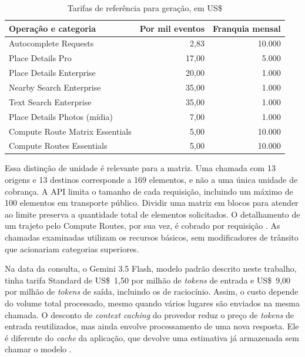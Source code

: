 \begin{table}[H]
\centering
\small
\caption{Tarifas de referência para geração, em US\$}
\label{tab:tarifas-geracao}
\begin{tabularx}{\textwidth}{>{\raggedright\arraybackslash}Xrr}
\hline
\textbf{Operação e categoria} & \textbf{Por mil eventos} & \textbf{Franquia mensal} \\
\hline
Autocomplete Requests & 2,83 & 10.000 \\
Place Details Pro & 17,00 & 5.000 \\
Place Details Enterprise & 20,00 & 1.000 \\
Nearby Search Enterprise & 35,00 & 1.000 \\
Text Search Enterprise & 35,00 & 1.000 \\
Place Details Photos (mídia) & 7,00 & 1.000 \\
Compute Route Matrix Essentials & 5,00 & 10.000 \\
Compute Routes Essentials & 5,00 & 10.000 \\
\hline
\end{tabularx}
\end{table}

Essa distinção de unidade é relevante para a matriz. Uma chamada com 13 origens e 13 destinos corresponde a 169 elementos, e não a uma única unidade de cobrança. A API limita o tamanho de cada requisição, incluindo um máximo de 100 elementos em transporte público. Dividir uma matriz em blocos para atender ao limite preserva a quantidade total de elementos solicitados. O detalhamento de um trajeto pelo Compute Routes, por sua vez, é cobrado por requisição \cite{google_routes_cobranca2026}. As chamadas examinadas utilizam os recursos básicos, sem modificadores de trânsito que acionariam categorias superiores.

Na data da consulta, o Gemini 3.5 Flash, modelo padrão descrito neste trabalho, tinha tarifa Standard de US\$~1,50 por milhão de \textit{tokens} de entrada e US\$~9,00 por milhão de \textit{tokens} de saída, incluindo os de raciocínio. Assim, o custo depende do volume total processado, mesmo quando vários lugares são enviados na mesma chamada. O desconto de \textit{context caching} do provedor reduz o preço de \textit{tokens} de entrada reutilizados, mas ainda envolve processamento de uma nova resposta. Ele é diferente do \textit{cache} da aplicação, que devolve uma estimativa já armazenada sem chamar o modelo \cite{google_gemini_precos2026}.

